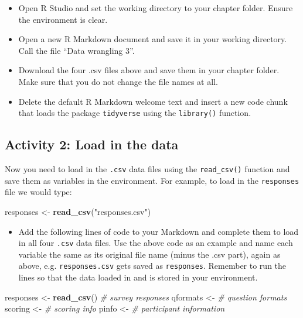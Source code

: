 \documentclass[]{book}
\newenvironment{Shaded}{\begin{snugshade}}{\end{snugshade}}
\newcommand{\CommentTok}[1]{\textcolor[rgb]{0.56,0.35,0.01}{\textit{#1}}}
\newcommand{\KeywordTok}[1]{\textcolor[rgb]{0.13,0.29,0.53}{\textbf{#1}}}
\newcommand{\NormalTok}[1]{#1}
\newcommand{\StringTok}[1]{\textcolor[rgb]{0.31,0.60,0.02}{#1}}
\providecommand{\tightlist}{%
  \setlength{\itemsep}{0pt}\setlength{\parskip}{0pt}}
\begin{document}
\begin{itemize}
\tightlist
\item
  Open R Studio and set the working directory to your chapter folder. Ensure the environment is clear.\\
\item
  Open a new R Markdown document and save it in your working directory. Call the file ``Data wrangling 3''.\\
\item
  Download the four .csv files above and save them in your chapter folder. Make sure that you do not change the file names at all.
\item
  Delete the default R Markdown welcome text and insert a new code chunk that loads the package \texttt{tidyverse} using the \texttt{library()} function.
\end{itemize}

\hypertarget{activity-2-load-in-the-data}{%
\subsection{Activity 2: Load in the data}\label{activity-2-load-in-the-data}}

Now you need to load in the \texttt{.csv} data files using the \texttt{read\_csv()} function and save them as variables in the environment. For example, to load in the \texttt{responses} file we would type:

\begin{Shaded}
\begin{Highlighting}[]
\NormalTok{responses <-}\StringTok{ }\KeywordTok{read_csv}\NormalTok{(}\StringTok{"responses.csv"}\NormalTok{) }
\end{Highlighting}
\end{Shaded}

\begin{itemize}
\tightlist
\item
  Add the following lines of code to your Markdown and complete them to load in all four \texttt{.csv} data files. Use the above code as an example and name each variable the same as its original file name (minus the .csv part), again as above, e.g. \texttt{responses.csv} gets saved as \texttt{responses}. Remember to run the lines so that the data loaded in and is stored in your environment.
\end{itemize}

\begin{Shaded}
\begin{Highlighting}[]
\NormalTok{responses <-}\StringTok{  }\KeywordTok{read_csv}\NormalTok{()    }\CommentTok{# survey responses}
\NormalTok{qformats <-}\StringTok{                 }\CommentTok{# question formats}
\NormalTok{scoring <-}\StringTok{                  }\CommentTok{# scoring info}
\NormalTok{pinfo <-}\StringTok{                    }\CommentTok{# participant information}
\end{Highlighting}
\end{Shaded}
\end{document}
